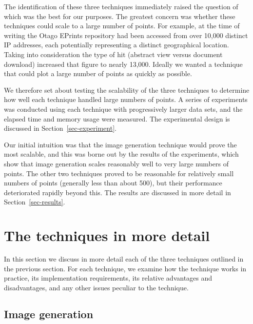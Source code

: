 \documentclass[acmtocl,acmnow]{acmtrans2m}
\begin{document}

The identification of these three techniques immediately raised the
question of which was the best for our purposes. The greatest concern
was whether these techniques could scale to a large number of points.
For example, at the time of writing the Otago EPrints repository had
been accessed from over 10,000 distinct IP addresses, each potentially
representing a distinct geographical location. Taking into consideration
the type of hit (abstract view versus document download) increased that
figure to nearly 13,000. Ideally we wanted a technique that could plot a
large number of points as quickly as possible.

We therefore set about testing the scalability of the three techniques
to determine how well each technique handled large numbers of points. A
series of experiments was conducted using each technique with
progressively larger data sets, and the elapsed time and memory usage
were measured. The experimental design is discussed in
Section~\ref{sec-experiment}.

Our initial intuition was that the image generation technique would
prove the most scalable, and this was borne out by the results of the
experiments, which show that image generation scales reasonably well to
very large numbers of points. The other two techniques proved to be
reasonable for relatively small numbers of points (generally less than
about 500), but their performance deteriorated rapidly beyond this. The
results are discussed in more detail in Section~\ref{sec-results}.


\section{The techniques in more detail}
\label{sec-techniques}

In this section we discuss in more detail each of the three techniques
outlined in the previous section. For each technique, we examine how the
technique works in practice, its implementation requirements, its
relative advantages and disadvantages, and any other issues peculiar
to the technique.


\subsection{Image generation}
\label{sec-imagegen}
\end{document}
